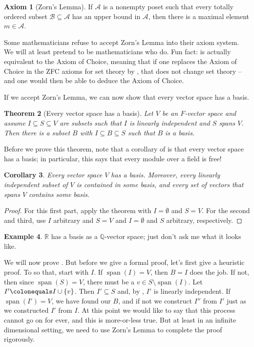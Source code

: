\documentclass[12pt]{report}
\newtheorem{theorem}{Theorem}[chapter]
\newtheorem{corollary}[theorem]{Corollary}
\numberwithin{equation}{section}
\numberwithin{theorem}{chapter}
\theoremstyle{definition}
\newtheorem{example}[theorem]{Example}
\newtheorem*{basic properties}{Basic Properties}
\newtheorem*{Important Remark}{Important Remark}
\newtheorem{axiom}[theorem]{Axiom}
\DeclareMathOperator{\Span}{span}
\begin{document}
\begin{axiom}[Zorn's Lemma]\label{Zorn}
If $\mathcal{A}$ is a nonempty poset such that every totally ordered subset $\mathcal{B} \subseteq \mathcal{A}$ has an upper bound in $\mathcal{A}$, then there is a maximal element $m \in \mathcal{A}$.
\end{axiom}


Some mathematicians refuse to accept Zorn's Lemma into their axiom system. We will at least pretend to be mathematicians who do. Fun fact:  is actually equivalent to the Axiom of Choice, meaning that if one replaces the Axiom of Choice in the ZFC axioms for set theory by , that does not change set theory -- and one would then be able to deduce the Axiom of Choice.

If we accept Zorn's Lemma, we can now show that every vector space has a basis.

\begin{theorem}[Every vector space has a basis]\label{basisexist}
 Let $V$ be an $F$-vector space and assume $I \subseteq S \subseteq V$ are subsets such that $I$ is linearly independent and $S$ spans $V$. Then there is a subset $B$ with $I \subseteq B \subseteq S$ such that $B$ is a basis.
\end{theorem}

Before we prove this theorem, note that a corollary of  is that every vector space has a basis; in particular, this says that every module over a field is free!

\begin{corollary}\label{every vector space has a basis}
Every vector space $V$ has a basis. Moreover, every linearly independent subset of $V$ is contained in some basis, and every set of vectors that spans $V$ contains some basis.  
\end{corollary}

\begin{proof} 
For this first part, apply the theorem with $I = \emptyset$ and $S = V$. For the second and third, use $I$ arbitrary and $S = V$ and $I = \emptyset$ and $S$ arbitrary, respectively. 
\end{proof}



\begin{example}
$\mathbb{R}$ has a basis as a $\mathbb{Q}$-vector space; just don't ask me what it looks like.
\end{example}


We will now prove .
But before we give a formal proof, let's first give a heuristic proof. To so that, start with $I$. If $\Span(I) = V$, then $B = I$ does the job. If not, then since $\Span(S)=V$, there must be a $v \in S \setminus \Span(I)$. Let $I' \colonequals I \cup \{v\}$. Then $I' \subseteq S$ and, by , $I'$ is linearly independent. 
If $\Span(I') = V$, we have found our $B$, and if not we construct $I''$ from $I'$ just as we constructed $I'$ from $I$. At this point we would like to say that this process cannot go on for ever, and this is more-or-less true. But at least in an infinite dimensional setting, we need to use Zorn's Lemma to complete the proof rigorously.
\end{document}
